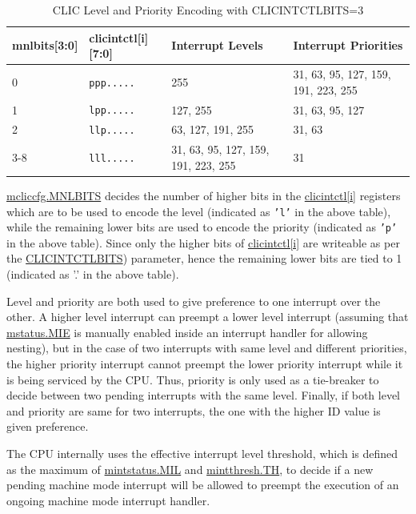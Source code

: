 \documentclass[main\_\_EN.tex]{subfiles}
\begin{document}
\begin{longtable}{ | l | l | l | l | }
\caption{CLIC Level and Priority Encoding with CLICINTCTLBITS=3}
\label{tab:riscv-clic-level-priority}
\\\hline
\rowcolor{lightgray}
mnlbits[3:0] & clicintctl[i][7:0] & Interrupt Levels & Interrupt Priorities \\ \hline
0   & \texttt{ppp.....} & 255 & 31, 63, 95, 127, 159, 191, 223, 255 \\ \hline
1   & \texttt{lpp.....} & 127, 255 & 31, 63, 95, 127 \\ \hline
2   & \texttt{llp.....} & 63, 127, 191, 255 & 31, 63 \\ \hline
3-8 & \texttt{lll.....} & 31, 63, 95, 127, 159, 191, 223, 255 & 31 \\ \hline
\end{longtable}

\hyperref[fielddesc:MCLICCFG_MNLBITS]{mcliccfg.MNLBITS} decides the number of higher bits in the \hyperref[regdesc:MCLICINTCTL_REG_i]{clicintctl[i]} registers which are to be used to encode the level (indicated as \texttt{'l'} in the above table), while the remaining lower bits are used to encode the priority (indicated as \texttt{'p'} in the above table). Since only the higher bits of \hyperref[regdesc:MCLICINTCTL_REG_i]{clicintctl[i]} are writeable as per the \hyperref[fielddesc:CLICINFO_CLICINTCTLBITS]{CLICINTCTLBITS}) parameter, hence the remaining lower bits are tied to 1 (indicated as '.' in the above table).

Level and priority are both used to give preference to one interrupt over the other. A higher level interrupt can preempt a lower level interrupt (assuming that \hyperref[fielddesc:MSTATUSMIE]{mstatus.MIE} is manually enabled inside an interrupt handler for allowing nesting), but in the case of two interrupts with same level and different priorities, the higher priority interrupt cannot preempt the lower priority interrupt while it is being serviced by the CPU. Thus, priority is only used as a tie-breaker to decide between two pending interrupts with the same level. Finally, if both level and priority are same for two interrupts, the one with the higher ID value is given preference.


The CPU internally uses the effective interrupt level threshold, which is defined as the maximum of \hyperref[fielddesc:MINTSTATUS_MIL]{{mintstatus.MIL}} and \hyperref[fielddesc:MINTTHRESH_TH]{{mintthresh.TH}}, to decide if a new pending machine mode interrupt will be allowed to preempt the execution of an ongoing machine mode interrupt handler.
\end{document}
